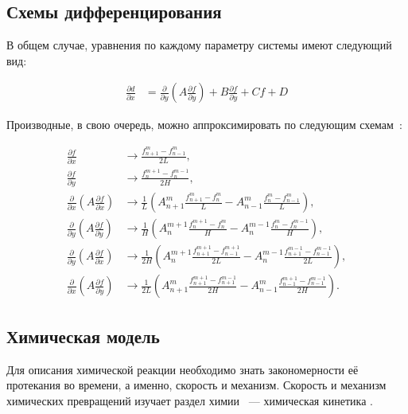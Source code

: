 \subsection{Схемы дифференцирования}

В общем случае, уравнения по каждому параметру системы имеют следующий вид:

\begin{align}
    \frac{\partial d}{\partial x} &= \frac{\partial}{\partial y}(A\frac{\partial f}{\partial y}) + B\frac{\partial f}{\partial y} + Cf + D
\end{align}

Производные, в свою очередь, можно аппроксимировать по следующим схемам~\cite{Wikipedia1, journal1}:

\begin{align}
    \frac{\partial f}{\partial x} &\longrightarrow \frac{f_{n + 1}^m - f_{n - 1}^m}{2L}, \\
    \frac{\partial f}{\partial y} &\longrightarrow \frac{f_n^{m + 1} - f_n^{m - 1}}{2H}, \\
    \frac{\partial}{\partial x}(A\frac{\partial f}{\partial x}) &\longrightarrow \frac{1}{L}(A_{n + 1}^m\frac{f_{n + 1}^m - f_n^m}{L} - A_{n - 1}^m\frac{f_n^m - f_{n - 1}^m}{L}), \\
    \frac{\partial}{\partial y}(A\frac{\partial f}{\partial y}) &\longrightarrow \frac{1}{H}(A_n^{m + 1}\frac{f_n^{m + 1} - f_n^m}{H} - A_n^{m - 1}\frac{f_n^m - f_n^{m - 1}}{H}), \\
    \frac{\partial}{\partial y}(A\frac{\partial f}{\partial x}) &\longrightarrow \frac{1}{2H}(A_n^{m + 1}\frac{f_{n + 1}^{m + 1} - f_{n - 1}^{m + 1}}{2L} - A_n^{m - 1}\frac{f_{n + 1}^{m - 1} - f_{n - 1}^{m - 1}}{2L}), \\
    \frac{\partial}{\partial x}(A\frac{\partial f}{\partial y}) &\longrightarrow \frac{1}{2L}(A_{n + 1}^m\frac{f_{n + 1}^{m + 1} - f_{n + 1}^{m - 1}}{2H} - A_{n - 1}^m\frac{f_{n - 1}^{m + 1} - f_{n - 1}^{m - 1}}{2H}).
\end{align}

\subsection{Химическая модель}

Для описания химической реакции необходимо знать закономерности её протекания во времени, а именно, скорость и механизм. Скорость и механизм химических превращений изучает раздел химии ~--- химическая кинетика \cite{Article5, book7, book8}.

